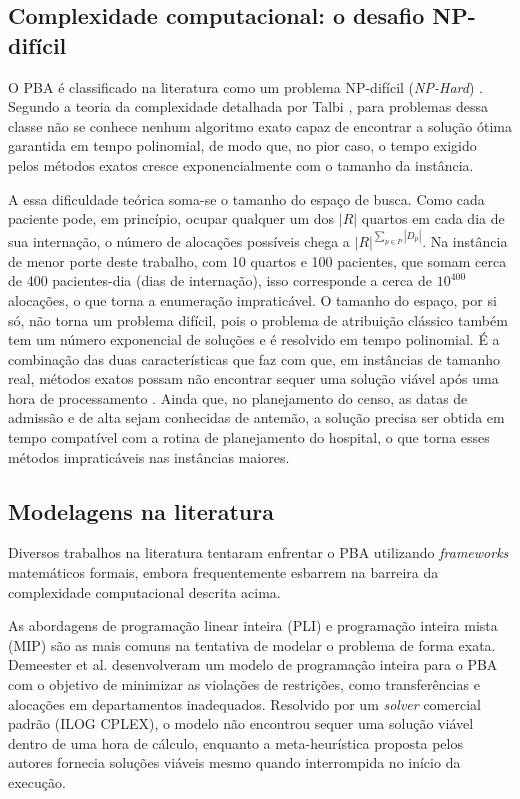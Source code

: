 \subsection{Complexidade computacional: o desafio NP-difícil}
\label{sec:complexidade}

O PBA é classificado na literatura como um problema NP-difícil (\textit{NP-Hard}) \cite{ceschia2012modeling, demeester2010hybrid, schafer2023combining}. Segundo a teoria da complexidade detalhada por Talbi \cite{talbi2009metaheuristics}, para problemas dessa classe não se conhece nenhum algoritmo exato capaz de encontrar a solução ótima garantida em tempo polinomial, de modo que, no pior caso, o tempo exigido pelos métodos exatos cresce exponencialmente com o tamanho da instância.

A essa dificuldade teórica soma-se o tamanho do espaço de busca. Como cada paciente pode, em princípio, ocupar qualquer um dos $|R|$ quartos em cada dia de sua internação, o número de alocações possíveis chega a $|R|^{\sum_{p \in P} |D_p|}$. Na instância de menor porte deste trabalho, com 10 quartos e 100 pacientes, que somam cerca de 400 pacientes-dia (dias de internação), isso corresponde a cerca de $10^{400}$ alocações, o que torna a enumeração impraticável. O tamanho do espaço, por si só, não torna um problema difícil, pois o problema de atribuição clássico também tem um número exponencial de soluções e é resolvido em tempo polinomial. É a combinação das duas características que faz com que, em instâncias de tamanho real, métodos exatos possam não encontrar sequer uma solução viável após uma hora de processamento \cite{demeester2010hybrid}. Ainda que, no planejamento do censo, as datas de admissão e de alta sejam conhecidas de antemão, a solução precisa ser obtida em tempo compatível com a rotina de planejamento do hospital, o que torna esses métodos impraticáveis nas instâncias maiores.

\subsection{Modelagens na literatura}

Diversos trabalhos na literatura tentaram enfrentar o PBA utilizando \textit{frameworks} matemáticos formais, embora frequentemente esbarrem na barreira da complexidade computacional descrita acima.

As abordagens de programação linear inteira (PLI) e programação inteira mista (MIP) são as mais comuns na tentativa de modelar o problema de forma exata. Demeester et al. \cite{demeester2010hybrid} desenvolveram um modelo de programação inteira para o PBA com o objetivo de minimizar as violações de restrições, como transferências e alocações em departamentos inadequados. Resolvido por um \textit{solver} comercial padrão (ILOG CPLEX), o modelo não encontrou sequer uma solução viável dentro de uma hora de cálculo, enquanto a meta-heurística proposta pelos autores fornecia soluções viáveis mesmo quando interrompida no início da execução.

